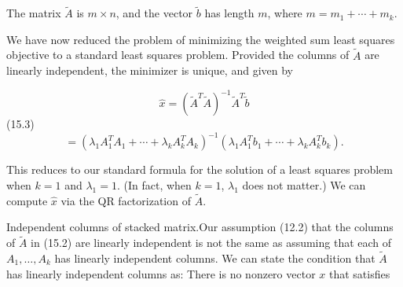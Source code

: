 The matrix \(\tilde{A}\) is \(m\times n\), and the vector \(\tilde{b}\) has length \(m\), where \(m=m_{1}+\cdots+m_{k}\).

We have now reduced the problem of minimizing the weighted sum least squares objective to a standard least squares problem. Provided the columns of \(\tilde{A}\) are linearly independent, the minimizer is unique, and given by

\[\hat{x} = (\tilde{A}^{T}\tilde{A})^{-1}\tilde{A}^{T}\tilde{b}\] (15.3) \[= (\lambda_{1}A_{1}^{T}A_{1}+\cdots+\lambda_{k}A_{k}^{T}A_{k})^{-1 }(\lambda_{1}A_{1}^{T}b_{1}+\cdots+\lambda_{k}A_{k}^{T}b_{k}).\]

This reduces to our standard formula for the solution of a least squares problem when \(k=1\) and \(\lambda_{1}=1\). (In fact, when \(k=1\), \(\lambda_{1}\) does not matter.) We can compute \(\hat{x}\) via the QR factorization of \(\tilde{A}\).

Independent columns of stacked matrix.Our assumption (12.2) that the columns of \(\tilde{A}\) in (15.2) are linearly independent is not the same as assuming that each of \(A_{1},\ldots,A_{k}\) has linearly independent columns. We can state the condition that \(\tilde{A}\) has linearly independent columns as: There is no nonzero vector \(x\) that satisfies 